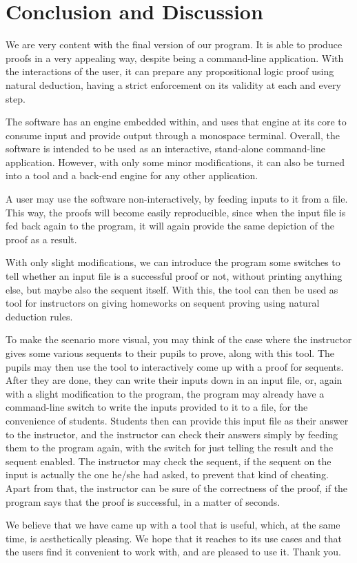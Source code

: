 \documentclass[12pt]{article}
\begin{document}
\section{Conclusion and Discussion}

We are very content with the final version of our program.
It is able to produce proofs in a very appealing way,
despite being a command-line application. With the
interactions of the user, it can prepare any
propositional logic proof using natural deduction, having a strict
enforcement on its validity at each and every step.

The software has an engine embedded within, and uses
that engine at its core to consume input and provide
output through a monospace terminal. Overall, the software
is intended to be used as an interactive, stand-alone
command-line application. However, with only some minor
modifications, it can also be turned into a tool and a
back-end engine for any other application.

A user may use the software non-interactively, by feeding
inputs to it from a file. This way, the proofs will become
easily reproducible, since when the input file is fed back
again to the program, it will again provide the same depiction
of the proof as a result.

With only slight modifications, we can introduce the program
some switches to tell whether an input file is a successful
proof or not, without printing anything else, but maybe also
the sequent itself. With this, the tool can then be used as
tool for instructors on giving homeworks on sequent proving
using natural deduction rules.

To make the scenario more visual,
you may think of the case where the instructor gives some
various sequents to their pupils to prove, along with this tool.
The pupils may then use the tool to interactively come
up with a proof for sequents. After they are done, they can
write their inputs down in an input file, or, again with
a slight modification to the program, the program may already
have a command-line switch to write the inputs provided to
it to a file, for the convenience of students. Students
then can provide this input file as their answer to the
instructor, and the instructor can check their answers
simply by feeding them to the program again, with the switch
for just telling the result and the sequent enabled.
The instructor may check the sequent, if the sequent on
the input is actually the one he/she had asked, to prevent
that kind of cheating. Apart from that, the instructor
can be sure of the correctness of the proof, if the program
says that the proof is successful, in a matter of seconds.

We believe that we have came up with a tool that is useful,
which, at the same time, is aesthetically pleasing. We hope
that it reaches to its use cases and that the users find it
convenient to work with, and are pleased to use it. Thank you.

 

\end{document}
